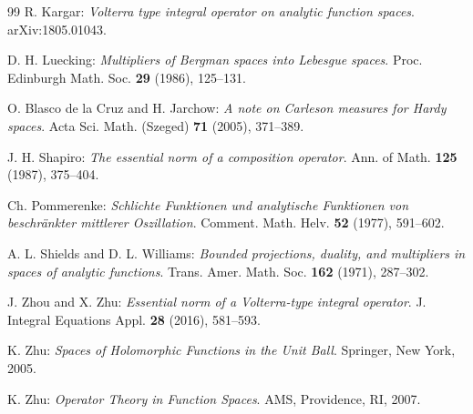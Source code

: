 \documentclass[preprint,12pt]{elsarticle}
\numberwithin{equation}{section}
\theoremstyle{remark}
\begin{document}
\begin{thebibliography}{99}
R. Kargar:
\textit{Volterra type integral operator on analytic function spaces}.
arXiv:1805.01043.

D. H. Luecking:
\textit{Multipliers of Bergman spaces into Lebesgue spaces}.
Proc. Edinburgh Math. Soc. \textbf{29} (1986), 125--131.

O. Blasco de la Cruz and H. Jarchow:
\textit{A note on Carleson measures for Hardy spaces}.
Acta Sci. Math. (Szeged) \textbf{71} (2005), 371--389.

J. H. Shapiro:
\textit{The essential norm of a composition operator}.
Ann. of Math. \textbf{125} (1987), 375--404.

Ch. Pommerenke:
\textit{Schlichte Funktionen und analytische Funktionen von beschränkter mittlerer Oszillation}.
Comment. Math. Helv. \textbf{52} (1977), 591--602.

A. L. Shields and D. L. Williams:
\textit{Bounded projections, duality, and multipliers in spaces of analytic functions}.
Trans. Amer. Math. Soc. \textbf{162} (1971), 287--302.

J. Zhou and X. Zhu:
\textit{Essential norm of a Volterra-type integral operator}.
J. Integral Equations Appl. \textbf{28} (2016), 581--593.

K. Zhu:
\textit{Spaces of Holomorphic Functions in the Unit Ball}.
Springer, New York, 2005.

K. Zhu:
\textit{Operator Theory in Function Spaces}.
AMS, Providence, RI, 2007.

\end{thebibliography}
\end{document}
